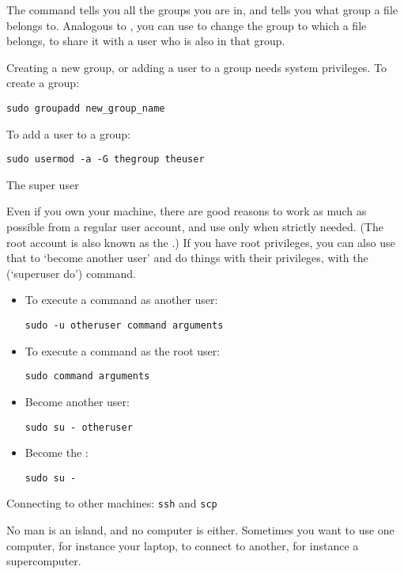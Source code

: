 The command 
tells you all the groups you are in, and  tells you
what group a file belongs to. Analogous to ,
you can use  to change the group to
which a file belongs, to share it with a user who is also in that group.

Creating a new group, or
adding a user to a group needs system privileges.
To create a group:
\begin{verbatim}
sudo groupadd new_group_name
\end{verbatim}
To add a user to a group:
\begin{verbatim}
sudo usermod -a -G thegroup theuser
\end{verbatim}

 {The super user}

Even if you own your machine, there are good reasons to work as much
as possible from a regular user account, and use
 only when strictly needed.
%
(The root account is also known as the .)
%
If you have root privileges, you can also use that to `become another
user' and do things with their privileges, with the
 (`superuser do') command.

\begin{itemize}
\item To execute a command as another user:
\begin{verbatim}
sudo -u otheruser command arguments
\end{verbatim}
\item To execute a command as the root user:
\begin{verbatim}
sudo command arguments
\end{verbatim}
\item Become another user:
\begin{verbatim}
sudo su - otheruser
\end{verbatim}
\item Become the :
\begin{verbatim}
sudo su -
\end{verbatim}
\end{itemize}

 {Connecting to other machines: {\tt ssh} and {\tt scp}}

No man is an island, and no computer is either. Sometimes you want to
use one computer, for instance your laptop, to connect to another, for
instance a supercomputer.

